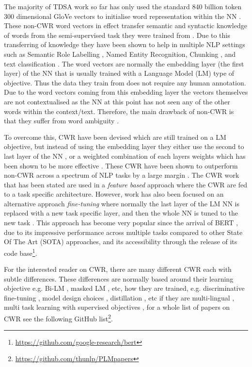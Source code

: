 The majority of TDSA work so far has only used the standard 840 billion token 300 dimensional GloVe vectors \citep{pennington-etal-2014-glove} to initialise word representation within the NN \citep{tang-etal-2016-aspect,tang-etal-2019-progressive}. These non-CWR word vectors in effect transfer semantic and syntactic knowledge of words from the semi-supervised task they were trained from \citep{mikolov2013efficient}. Due to this transferring of knowledge they have been shown to help in multiple NLP settings such as Semantic Role Labelling \citep{collobert2008unified}, Named Entity Recognition, Chunking \citep{turian-etal-2010-word}, and text classification \citep{kim-2014-convolutional}. The word vectors are normally the embedding layer (the first layer) of the NN that is usually trained with a Language Model (LM) type of objective. Thus the data they train from does not require any human annotation. Due to the word vectors coming from this embedding layer the vectors themselves are not contextualised as the NN at this point has not seen any of the other words within the context/text. Therefore, the main drawback of non-CWR is that they suffer from word ambiguity \citep{camacho2018word}. 

To overcome this, CWR have been devised which are still trained on a LM objective, but instead of using the embedding layer they either use the second to last layer of the NN \citep{peters-etal-2017-semi}, or a weighted combination of each layers weights which has been shown to be more effective \citep{peters-etal-2018-deep}. These CWR have been shown to outperform non-CWR across a spectrum of NLP tasks by a large margin \citep{liu-etal-2019-linguistic}. The CWR work that has been stated are used in a \textit{feature based} approach where the CWR are fed to a task specific architecture. However, work has also been focused on an alternative approach \textit{fine-tuning} where normally the last layer of the LM NN is replaced with a new task specific layer, and then the whole NN is tuned to the new task \citep{radford2018improving, howard-ruder-2018-universal}. This approach has become very popular since the arrival of BERT \citep{devlin-etal-2019-bert}, due to its impressive performance across multiple tasks compared to other State Of The Art (SOTA) approaches, and its accessibility through the release of its code base\footnote{\url{https://github.com/google-research/bert}}. 

For the interested reader on CWR, there are many different CWR each with subtle differences. These differences are normally based around their learning objective e.g. Bi-LM \citep{peters-etal-2018-deep}, masked LM \citep{devlin-etal-2019-bert}, etc, how they are trained, e.g. discriminative fine-tuning \citep{howard-ruder-2018-universal}, model design choices \citep{liu2019roberta}, distillation \citep{tsai-etal-2019-small}, etc if they are multi-lingual \citep{conneau2019cross}, multi task learning with supervised objectives \citep{liu-etal-2019-multi}, for a whole list of papers on CWR see the following GitHub list\footnote{\url{https://github.com/thunlp/PLMpapers}}.

